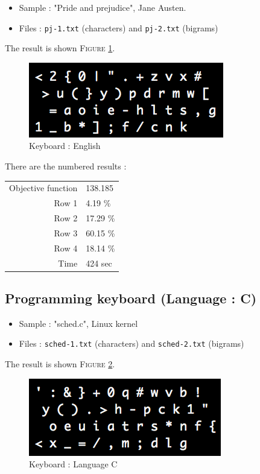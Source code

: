 \documentclass[a4paper,titlepage]{article}
\begin{document}
\begin{itemize}
	\item Sample : "Pride and prejudice", Jane Austen.
	\item Files : \texttt{pj-1.txt} (characters) and \texttt{pj-2.txt} (bigrams)
\end{itemize}
The result is shown \textsc{Figure} \ref{english}.
\begin{figure}[h]
	\centering
	\includegraphics[scale=1]{images/English.png}
	\caption{Keyboard : English}
	\label{english}
\end{figure}

There are the numbered results : 
\begin{center}
	\begin{tabular}{r|l}
		Objective function & 138.185\\
		Row 1 & 4.19 \%\\
		Row 2 & 17.29 \%\\
		Row 3 & 60.15 \%\\
		Row 4 & 18.14 \%\\
		Time & 424 sec
	\end{tabular}
\end{center}

	\subsection{Programming keyboard (Language : C)}

\begin{itemize}
	\item Sample : "sched.c", Linux kernel
	\item Files : \texttt{sched-1.txt} (characters) and \texttt{sched-2.txt} (bigrams)
\end{itemize}
The result is shown \textsc{Figure} \ref{C}.
\begin{figure}[h]
	\centering
	\includegraphics[scale=1]{images/C.png}
	\caption{Keyboard : Language C}
	\label{C}
\end{figure}
\end{document}
